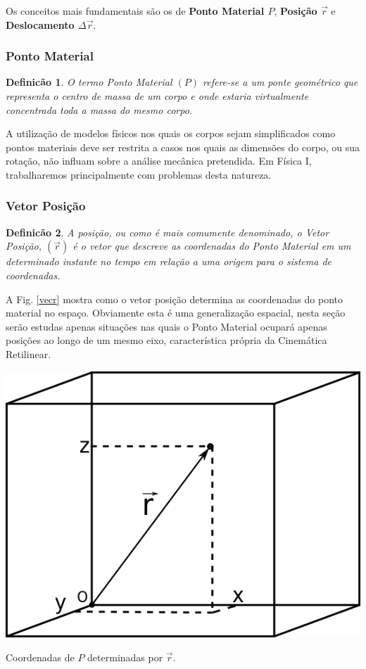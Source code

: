 \documentclass[a4paper, 11pt]{report}
\newtheorem{mydef}{Definicão}
\begin{document}
Os conceitos mais fundamentais são os de \textbf{Ponto Material $P$}, 
\textbf{Posição $\vec{r}$} e \textbf{Deslocamento $\Delta \vec{r}$}.

\subsubsection*{Ponto Material}
\begin{mydef}
    O termo Ponto Material $(P)$ refere-se a um ponte geométrico que representa
    o centro de massa de um corpo e onde estaria virtualmente concentrada toda a massa do 
    mesmo corpo. 
\end{mydef}

A utilização de modelos físicos nos quais os corpos sejam simplificados como pontos materiais
deve ser restrita a casos nos quais as dimensões do corpo, ou sua rotação,
não influam sobre a análise mecânica pretendida. Em Física I, trabalharemos 
principalmente com problemas desta natureza. 

\subsubsection*{Vetor Posição}
\begin{mydef}
    A posição, ou como é mais comumente denominado, o Vetor Posição, 
    $(\vec{r})$ é o vetor que descreve as coordenadas do Ponto Material em um 
    determinado instante no tempo em relação a uma origem para o sistema de
    coordenadas.
\end{mydef}

A Fig. \ref{vecr} mostra como o vetor posição determina as coordenadas do 
ponto material no espaço. Obviamente esta é uma generalização espacial, nesta 
seção serão estudas apenas situações nas quais o Ponto Material ocupará apenas 
posições ao longo de um mesmo eixo, característica própria da Cinemática 
Retilinear.\\

\begin{staticfigure}
    \centering
    
    \includegraphics[scale=1]{img/vecr.png}
    
    \caption{\footnotesize Coordenadas de $P$ determinadas por $\vec{r}$.}

    \label{vecr}
\end{staticfigure}
\end{document}
